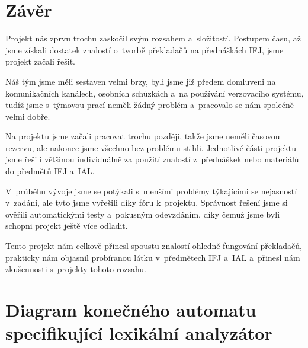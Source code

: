 \documentclass[a4paper, 11pt]{article}
\begin{document}
	\section{Závěr}

	Projekt nás zprvu trochu zaskočil svým rozsahem a~složitostí. Postupem času, až jsme získali dostatek
	znalostí o~tvorbě překladačů na přednáškách IFJ, jsme projekt začali řešit.

	Náš tým jsme měli sestaven velmi brzy, byli jsme již předem domluveni na komunikačních kanálech,
	osobních schůzkách a~na používání verzovacího systému, tudíž jsme s~týmovou prací neměli žádný
	problém a~pracovalo se nám společně velmi dobře.

	Na projektu jsme začali pracovat trochu později, takže jsme neměli časovou rezervu, ale nakonec
	jsme všechno bez problému stihli. Jednotlivé části projektu jsme řešili většinou individuálně za použití
	znalostí z~přednáškek nebo materiálů do předmětů IFJ a~IAL.

	V~průběhu vývoje jsme se potýkali s~menšími problémy týkajícími se nejasností v~zadání, ale
	tyto jsme vyřešili díky fóru k~projektu. Správnost řešení jsme si ověřili automatickými
	testy a~pokusným odevzdáním, díky čemuž jsme byli schopni projekt ještě více odladit.

	Tento projekt nám celkově přinesl spoustu znalostí ohledně fungování překladačů, prakticky nám
	objasnil probíranou látku v~předmětech IFJ a~IAL a~přinesl nám zkušennosti s~projekty tohoto rozsahu.



	\clearpage
	
	\renewcommand{\refname}{Literatura}
	


	\clearpage
	\appendix

	\section{Diagram konečného automatu specifikující lexikální analyzátor}
\end{document}
